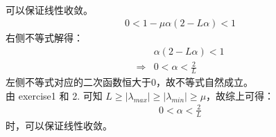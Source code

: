 \documentclass[11pt,letter,notitlepage]{article}
\begin{document}
\begin{solution}
\begin{enumerate}
\begin{align*}
        \end{align*}
        可以保证线性收敛。
        \begin{align*}
            0 < 1-\mu \alpha(2-L \alpha) < 1
        \end{align*}
        右侧不等式解得：
        \begin{align*}
            &\alpha(2-L \alpha) < 1 \\ \Rightarrow & 0<\alpha<\frac{2}{L}
        \end{align*}
        左侧不等式对应的二次函数恒大于0，故不等式自然成立。\\
        由 exercise1 和 2. 可知 $L \geqslant |\lambda_{max} | \geqslant |\lambda_{min} | \geqslant \mu$，故综上可得：
        \begin{align*}
            0<\alpha<\frac{2}{L}
        \end{align*}
        时，可以保证线性收敛。
    \end{enumerate}

\end{solution}
\newpage
\end{document}
